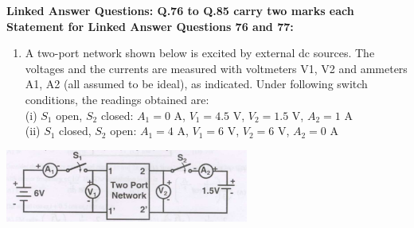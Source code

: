 \documentclass[12pt]{article}
\begin{document}
\vspace{1em}
 \large \textbf {Linked Answer Questions: Q.76 to Q.85 carry two marks each}
 \large \textbf {Statement for Linked Answer Questions 76 and 77: }
\vspace{1em}
\begin{enumerate}
\item A two-port network shown below is excited by external dc sources. The voltages and the currents are measured with voltmeters V1, V2 and ammeters A1, A2 (all assumed to be ideal), as indicated. Under following switch conditions, the readings obtained are: \\
(i) $S_1$ open, $S_2$ closed: $A_1=0$ A, $V_1=4.5$ V, $V_2=1.5$ V, $A_2=1$ A \\
(ii) $S_1$ closed, $S_2$ open: $A_1=4$ A, $V_1=6$ V, $V_2=6$ V, $A_2=0$ A
\end{enumerate}
\begin{center}
\includegraphics[width=0.6\textwidth]{figs/q7677.png}
\end{center}
\end{document}
